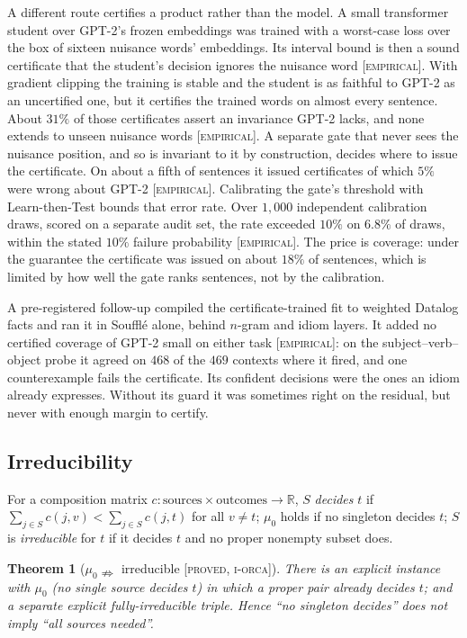 \documentclass[11pt]{article}
\theoremstyle{definition}
\theoremstyle{plain}
\newtheorem{theorem}{Theorem}[section]
\theoremstyle{remark}
\newcommand{\proved}{\textsc{[proved, i-orca]}}
\newcommand{\empirical}{\textsc{[empirical]}}
\newcommand{\RR}{\mathbb{R}}
\begin{document}
A different route certifies a product rather than the model. A small transformer student over GPT-2's frozen
embeddings was trained with a worst-case loss over the box of sixteen nuisance words' embeddings. Its interval bound
is then a sound certificate that the student's decision ignores the nuisance word \empirical{}. With gradient
clipping the training is stable and the student is as faithful to GPT-2 as an uncertified one, but it certifies the
trained words on almost every sentence. About $31\%$ of those certificates assert an invariance GPT-2 lacks, and none
extends to unseen nuisance words \empirical{}. A separate gate that never sees the nuisance position, and so is
invariant to it by construction, decides where to issue the certificate. On about a fifth of sentences it issued
certificates of which $5\%$ were wrong about GPT-2 \empirical{}. Calibrating the gate's
threshold with Learn-then-Test bounds that error rate. Over $1{,}000$ independent calibration draws, scored on a
separate audit set, the rate exceeded $10\%$ on $6.8\%$ of draws, within the stated $10\%$ failure probability
\empirical{}. The price is coverage: under the guarantee the certificate was issued on about $18\%$ of sentences,
which is limited by how well the gate ranks sentences, not by the calibration.

A pre-registered follow-up compiled the certificate-trained fit to weighted Datalog facts and ran it in Soufflé
alone, behind $n$-gram and idiom layers. It added no certified coverage of GPT-2 small on either task
\empirical{}: on the subject--verb--object probe it agreed on $468$ of the $469$ contexts where it fired, and one
counterexample fails the certificate. Its confident decisions were the ones an idiom already expresses. Without its
guard it was sometimes right on the residual, but never with enough margin to certify.

\subsection{Irreducibility}

For a composition matrix $c:\text{sources}\times\text{outcomes}\to\RR$, $S$ \emph{decides} $t$ if
$\sum_{j\in S}c(j,v)<\sum_{j\in S}c(j,t)$ for all $v\neq t$; $\mu_0$ holds if no singleton decides $t$;
$S$ is \emph{irreducible} for $t$ if it decides $t$ and no proper nonempty subset does.

\begin{theorem}[$\mu_0\nRightarrow$ irreducible \proved{}]\label{thm:irr}
There is an explicit instance with $\mu_0$ (no single source decides $t$) in which a proper pair already
decides $t$; and a separate explicit fully-irreducible triple. Hence ``no singleton decides'' does not
imply ``all sources needed''.
\end{theorem}
\end{document}
